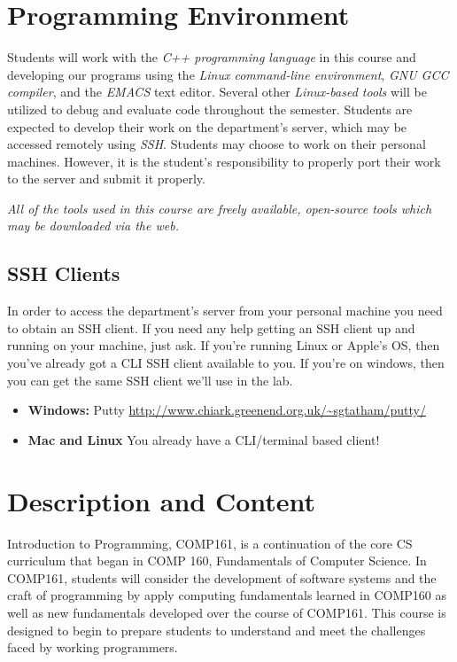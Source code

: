 \documentclass[10pt]{article}
\begin{document}
\section{Programming Environment}

Students will work with the \textit{C++ programming language} in this course and developing our programs using the \textit{Linux command-line environment}, \textit{GNU GCC compiler}, and the \textit{EMACS} text editor.  Several other \textit{Linux-based tools} will be utilized to debug and evaluate code throughout the semester. Students are expected to develop their work on the department's server, which may be accessed remotely using \textit{SSH}.  Students may choose to  work on their personal machines. However, it is the student's responsibility to properly port their work to the server and submit it properly.

\textit{All of the tools used in this course are freely available, open-source tools which may be downloaded via the web.}


\subsection{SSH Clients}

In order to access the department's server from your personal machine you need to obtain an SSH client. If you need any help getting an SSH client up and running on your machine, just ask.  If you're running Linux or Apple's OS, then you've already got a CLI SSH client available to you.  If you're on windows, then you can get the same SSH client we'll use in the lab.
\begin{itemize}
\item \textbf{Windows:} Putty \url{http://www.chiark.greenend.org.uk/~sgtatham/putty/}
\item \textbf{Mac and Linux} You already have a CLI/terminal based client!
\end{itemize}

\section{Description and Content}

Introduction to Programming, COMP161, is a continuation of the core CS curriculum that began in COMP 160, Fundamentals of Computer Science.  In COMP161, students will consider the development of software systems and the craft of programming by apply computing fundamentals learned in COMP160 as well as new fundamentals developed over the course of COMP161. This course is designed to begin to prepare students to understand and meet the challenges faced by working programmers.
\end{document}
